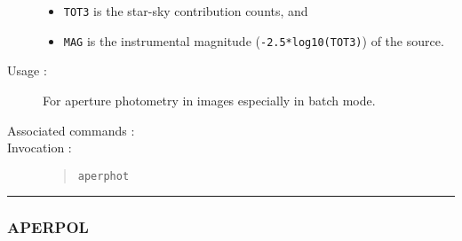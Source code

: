 \begin{description}
\begin{itemize}
\item {\tt TOT3} is the star-sky contribution counts, and

\item {\tt MAG} is the instrumental magnitude ({\tt -2.5*log10(TOT3)}) of the
source.

\end{itemize}

\item[Usage :] For aperture photometry in images especially in batch
mode.
\item[Associated commands :] {\tt {}}
\item[Invocation :]

\begin{quote}{\tt  aperphot }\end{quote}

\end{description}

\hrule
\subsubsection*{\label{APERPOL}APERPOL}

